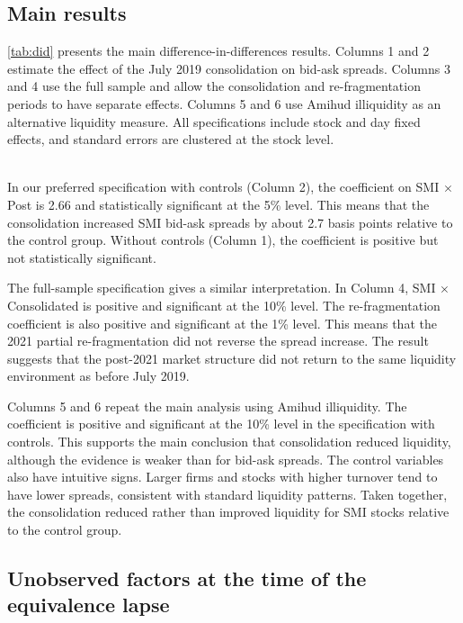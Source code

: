 \subsection{Main results}
\label{sec:main-results}

\autoref{tab:did} presents the main difference-in-differences results. Columns 1 and 2 estimate the effect of the July 2019 consolidation on bid-ask spreads. Columns 3 and 4 use the full sample and allow the consolidation and re-fragmentation periods to have separate effects. Columns 5 and 6 use Amihud illiquidity as an alternative liquidity measure. All specifications include stock and day fixed effects, and standard errors are clustered at the stock level.


\TableThreeDescription
\\

In our preferred specification with controls (Column 2), the coefficient on SMI $\times$ Post is 2.66 and statistically significant at the 5\% level. This means that the consolidation increased SMI bid-ask spreads by about 2.7 basis points relative to the control group. Without controls (Column 1), the coefficient is positive but not statistically significant.

The full-sample specification gives a similar interpretation. In Column 4, SMI $\times$ Consolidated is positive and significant at the 10\% level. The re-fragmentation coefficient is also positive and significant at the 1\% level. This means that the 2021 partial re-fragmentation did not reverse the spread increase. The result suggests that the post-2021 market structure did not return to the same liquidity environment as before July 2019.

Columns 5 and 6 repeat the main analysis using Amihud illiquidity. The coefficient is positive and significant at the 10\% level in the specification with controls. This supports the main conclusion that consolidation reduced liquidity, although the evidence is weaker than for bid-ask spreads. The control variables also have intuitive signs. Larger firms and stocks with higher turnover tend to have lower spreads, consistent with standard liquidity patterns.
Taken together, the consolidation reduced rather than improved liquidity for SMI stocks relative to the control group.

\subsection{Unobserved factors at the time of the equivalence lapse}
\label{sec:unobserved-factors}

